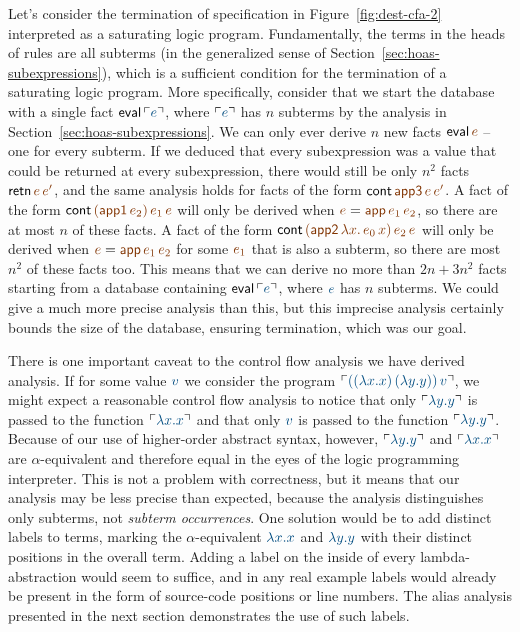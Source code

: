 Let's consider the termination of specification in
Figure~\ref{fig:dest-cfa-2} interpreted as a saturating logic program.
Fundamentally, the terms in the heads of rules are all subterms (in
the generalized sense of Section~\ref{sec:hoas-subexpressions}), which
is a sufficient condition for the termination of a saturating logic
program. More specifically, consider that we start the database with a
single fact ${\sf eval}\,\interp{e}$, where $\interp{e}$ has $n$
subterms by the analysis in Section~\ref{sec:hoas-subexpressions}.  We
can only ever derive $n$ new facts ${\sf eval}\,\lf{e}$ -- one for
every subterm. If we deduced that every subexpression was a value that
could be returned at every subexpression, there would still be only
$n^2$ facts ${\sf retn}\,\lf{e}\,\lf{e'}$, and the same analysis holds
for facts of the form ${\sf cont}\,\lf{\sf app3}\,\lf{e}\,\lf{e'}$.  A
fact of the form ${\sf cont}\,\lf{({\sf
    app1}\,e_2)}\,\lf{e_1}\,\lf{e}$ will only be derived when $\lf{e}
= \lf{{\sf app}\,e_1\,e_2}$, so there are at most $n$ of these
facts. A fact of the form ${\sf cont}\,\lf{({\sf app2}\,\lambda
  x.\,e_0\,x)}\,\lf{e_2}\,\lf{e}$ will only be derived when $\lf{e} =
\lf{{\sf app}\,\lf{e_1}\,\lf{e_2}}$ for some $\lf{e_1}$ that is also a
subterm, so there are most $n^2$ of these facts too. This means that
we can derive no more than $2n + 3n^2$ facts starting from a database
containing ${\sf eval}\,\interp{e}$, where $\obj{e}$ has $n$ subterms.
We could give a much more precise analysis than this, but this
imprecise analysis certainly bounds the size of the database, ensuring
termination, which was our goal.

There is one important caveat to the control flow analysis we have derived 
analysis. If for some value
$\obj{v}$ we consider the program $\interp{((\lambda x.x)\,(\lambda
  y.y))\,v}$, we might expect a reasonable control flow analysis to
notice that only $\interp{\lambda y.y}$ is passed to the function
$\interp{\lambda x.x}$ and that only $\obj{v}$ is passed to the
function $\interp{\lambda y.y}$. Because of our use of higher-order
abstract syntax, however, $\interp{\lambda y.y}$ and $\interp{\lambda
  x.x}$ are $\alpha$-equivalent and therefore equal in the eyes of the
logic programming interpreter. This is not a problem with correctness,
but it means that our analysis may be less precise than expected,
because the analysis distinguishes only subterms, not {\it subterm
  occurrences}. One solution would be to add distinct labels to terms,
marking the $\alpha$-equivalent $\obj{\lambda x.x}$ and $\obj{\lambda
  y.y}$ with their distinct positions in the overall term. Adding a
label on the inside of every lambda-abstraction would seem to suffice,
and in any real example labels would already be present in the form of
source-code positions or line numbers. The alias analysis presented in
the next section demonstrates the use of such labels.

